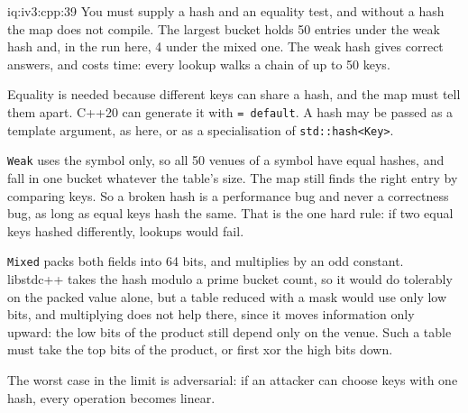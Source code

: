 \begin{solution}{iq:iv3:cpp:39}
You must supply a hash and an equality test, and without a hash the map does not compile. The largest bucket holds 50 entries under the weak hash and, in the run here, 4 under the mixed one. The weak hash gives correct answers, and costs time: every lookup walks a chain of up to 50 keys.

Equality is needed because different keys can share a hash, and the map must tell them apart. C++20 can generate it with \texttt{= default}. A hash may be passed as a template argument, as here, or as a specialisation of \texttt{std::hash<Key>}.

\texttt{Weak} uses the symbol only, so all 50 venues of a symbol have equal hashes, and fall in one bucket whatever the table's size. The map still finds the right entry by comparing keys. So a broken hash is a performance bug and never a correctness bug, as long as equal keys hash the same. That is the one hard rule: if two equal keys hashed differently, lookups would fail.

\texttt{Mixed} packs both fields into 64 bits, and multiplies by an odd constant. libstdc++ takes the hash modulo a prime bucket count, so it would do tolerably on the packed value alone, but a table reduced with a mask would use only low bits, and multiplying does not help there, since it moves information only upward: the low bits of the product still depend only on the venue. Such a table must take the top bits of the product, or first xor the high bits down.

The worst case in the limit is adversarial: if an attacker can choose keys with one hash, every operation becomes linear.

\end{solution}

